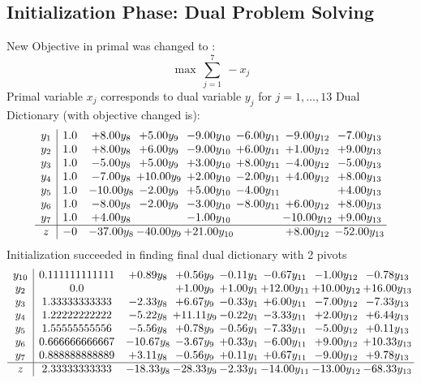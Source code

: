 \documentclass[8pt]{article}
\begin{document}
\subsection{Initialization Phase: Dual Problem Solving}
New Objective in primal was changed to : \[ \max\ \sum_{j=1}^{7}\ - x_j \] 
Primal variable $x_j$ corresponds to dual variable $y_j$ for $j = 1,\ldots,13$
Dual Dictionary (with objective changed is): 
\[\begin{array}{c| c c@{\hskip 2pt} c@{\hskip 2pt} c@{\hskip 2pt} c@{\hskip 2pt} c@{\hskip 2pt} c@{\hskip 2pt} }
 y_{1}   &  1.0 & +  8.00 y_{8} & +  5.00 y_{9} & -9.00 y_{10} & -6.00 y_{11} & -9.00 y_{12} & -7.00 y_{13}\\
 y_{2}   &  1.0 & +  8.00 y_{8} & +  6.00 y_{9} & -9.00 y_{10} & +  6.00 y_{11} & +  1.00 y_{12} & +  9.00 y_{13}\\
 y_{3}   &  1.0 & -5.00 y_{8} & +  5.00 y_{9} & +  3.00 y_{10} & +  8.00 y_{11} & -4.00 y_{12} & -5.00 y_{13}\\
 y_{4}   &  1.0 & -7.00 y_{8} & + 10.00 y_{9} & +  2.00 y_{10} & -2.00 y_{11} & +  4.00 y_{12} & +  8.00 y_{13}\\
 y_{5}   &  1.0 & -10.00 y_{8} & -2.00 y_{9} & +  5.00 y_{10} & -4.00 y_{11} &   & +  4.00 y_{13}\\
 y_{6}   &  1.0 & -8.00 y_{8} & -2.00 y_{9} & -3.00 y_{10} & -8.00 y_{11} & +  6.00 y_{12} & +  8.00 y_{13}\\
 y_{7}   &  1.0 & +  4.00 y_{8} &   & -1.00 y_{10} &   & -10.00 y_{12} & +  9.00 y_{13}\\
\hline
z    &  -0 & -37.00 y_{8} & -40.00 y_{9} & + 21.00 y_{10} &   & +  8.00 y_{12} & -52.00 y_{13}\\
\end{array}\]
Initialization succeeded in finding final dual dictionary with 2 pivots
\[\begin{array}{c| c c@{\hskip 2pt} c@{\hskip 2pt} c@{\hskip 2pt} c@{\hskip 2pt} c@{\hskip 2pt} c@{\hskip 2pt} }
 y_{10}   &  0.111111111111 & +  0.89 y_{8} & +  0.56 y_{9} & -0.11 y_{1} & -0.67 y_{11} & -1.00 y_{12} & -0.78 y_{13}\\
 y_{2}   &  0.0  &   & +  1.00 y_{9} & +  1.00 y_{1} & + 12.00 y_{11} & + 10.00 y_{12} & + 16.00 y_{13}\\
 y_{3}   &  1.33333333333 & -2.33 y_{8} & +  6.67 y_{9} & -0.33 y_{1} & +  6.00 y_{11} & -7.00 y_{12} & -7.33 y_{13}\\
 y_{4}   &  1.22222222222 & -5.22 y_{8} & + 11.11 y_{9} & -0.22 y_{1} & -3.33 y_{11} & +  2.00 y_{12} & +  6.44 y_{13}\\
 y_{5}   &  1.55555555556 & -5.56 y_{8} & +  0.78 y_{9} & -0.56 y_{1} & -7.33 y_{11} & -5.00 y_{12} & +  0.11 y_{13}\\
 y_{6}   &  0.666666666667 & -10.67 y_{8} & -3.67 y_{9} & +  0.33 y_{1} & -6.00 y_{11} & +  9.00 y_{12} & + 10.33 y_{13}\\
 y_{7}   &  0.888888888889 & +  3.11 y_{8} & -0.56 y_{9} & +  0.11 y_{1} & +  0.67 y_{11} & -9.00 y_{12} & +  9.78 y_{13}\\
\hline
z    &  2.33333333333 & -18.33 y_{8} & -28.33 y_{9} & -2.33 y_{1} & -14.00 y_{11} & -13.00 y_{12} & -68.33 y_{13}\\
\end{array}\]
\end{document}

